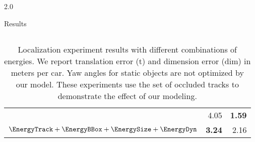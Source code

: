 \documentclass[handout,final]{beamer}
\newlength{\onecolwid}
\begin{document}
\begin{frame}[t]
\begin{columns}[t]
\begin{column}{2.0\onecolwid}
\begin{block}{Results}
\begin{columns}[t]
\begin{table}
\begin{tabular}{lrr}
              & 4.05  & {\bf 1.59}\\        
              $\EnergyTrack + \EnergyBBox +\EnergySize+\EnergyDyn$             
              & {\bf 3.24}  & 2.16\\
              \bottomrule
            \end{tabular}
            \caption{\small Localization experiment results with different combinations of energies. We report translation error (t) and dimension error (dim) in meters per car. Yaw angles for static objects are not optimized by our model. These experiments use the set of occluded tracks to demonstrate the effect of our modeling.}
            \label{tab:localizationExperiment}
          \end{table}
        \end{columns}
      \end{block}


\end{column}
\end{columns}
\end{frame}
\end{document}
